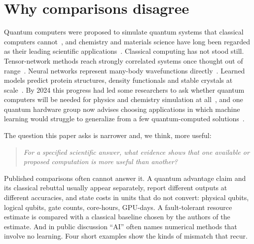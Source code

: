 \documentclass[10pt,a4paper]{article}
\begin{document}
\section{Why comparisons disagree}
\label{sec:intro}

Quantum computers were proposed to simulate quantum systems that classical computers cannot~\cite{feynman1982,lloyd1996}, and chemistry and materials science have long been regarded as their leading scientific applications~\cite{aspuru2005,reiher2017,bauer2020}. Classical computing has not stood still. Tensor-network methods reach strongly correlated systems once thought out of range~\cite{white1992,chan2011}. Neural networks represent many-body wavefunctions directly~\cite{carleo2017,carleo2019}. Learned models predict protein structures, density functionals and stable crystals at scale~\cite{jumper2021,luise2025,merchant2023}. By 2024 this progress had led some researchers to ask whether quantum computers will be needed for physics and chemistry simulation at all~\cite{gent2024}, and one quantum hardware group now advises choosing applications in which machine learning would struggle to generalize from a few quantum-computed solutions~\cite{babbush2025}.

The question this paper asks is narrower and, we think, more useful:
\begin{quote}
\emph{For a specified scientific answer, what evidence shows that one available or proposed computation is more useful than another?}
\end{quote}
Published comparisons often cannot answer it. A quantum advantage claim and its classical rebuttal usually appear separately, report different outputs at different accuracies, and state costs in units that do not convert: physical qubits, logical qubits, gate counts, core-hours, GPU-days. A fault-tolerant resource estimate is compared with a classical baseline chosen by the authors of the estimate. And in public discussion ``AI'' often names numerical methods that involve no learning. Four short examples show the kinds of mismatch that recur.
\end{document}
